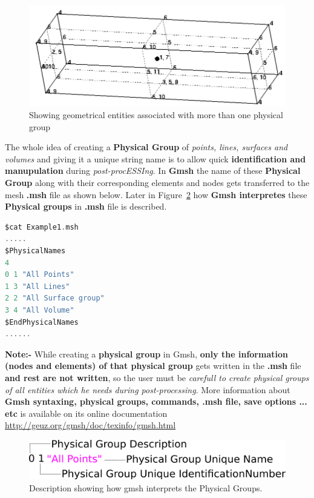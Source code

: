 \documentclass[11pt]{article}
\begin{document}
\begin{figure}[h]
  \centering
  \includegraphics[scale=0.3]{Images/MultiplePhysicalGroups.png}
  \caption{\label{multiple-physical-groups} Showing geometrical entities associated 
  with more than one physical group}
\end{figure}

The whole idea of creating a \textbf{Physical Group} of \textit{points, lines,
surfaces  and  volumes}  and  giving it a unique string name is to allow quick
\textbf{identification  and  manupulation} during \textit{post-procESSIng}. In
\textbf{Gmsh}  the  name  of  these  \textbf{Physical  Group} along with their
corresponding  elements  and  nodes gets transferred to the mesh \textbf{.msh}
file   as   shown   below.   Later   in  Figure~\ref{gmsh-physical-group}  how
\textbf{Gmsh interpretes} these \textbf{Physical groups} in \textbf{.msh} file
is described.

\begin{lstlisting}[language=C]
$cat Example1.msh
.....
$PhysicalNames
4
0 1 "All Points"
1 3 "All Lines"
2 2 "All Surface group"
3 4 "All Volume"
$EndPhysicalNames
......
\end{lstlisting}

\textbf{Note:-   }   While   creating   a  \textbf{physical  group}  in  Gmsh,
\textbf{only the information (nodes and elements) of that physical group} gets
written  in  the  \textbf{.msh} file \textbf{and rest are not written}, so the
user  must  be  \emph{carefull  to create physical groups of all entities
which  he  needs  during post-processing}. More information about \textbf{Gmsh
syntaxing,  physical  groups,  commands,  .msh  file, save options ... etc} is
available            on           its           online           documentation
\url{http://geuz.org/gmsh/doc/texinfo/gmsh.html}

\begin{figure}[h]
  \includegraphics[scale=1.8]{Images/PhysicalDes.png}
  \centering
  \caption{\label{gmsh-physical-group} Description showing how gmsh interprets the Physical Groups.}
\end{figure}
\end{document}

